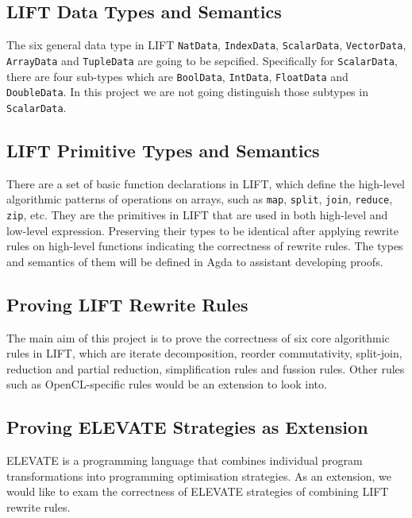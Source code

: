 \documentclass[]{article}
\begin{document}
\subsection{LIFT Data Types and Semantics}
The six general data type in LIFT \texttt{NatData}, \texttt{IndexData}, \texttt{ScalarData}, 
\texttt{VectorData}, \texttt{ArrayData} and \texttt{TupleData} are going to be sepcified. Specifically 
for \texttt{ScalarData}, there are four sub-types which are \texttt{BoolData}, \texttt{IntData}, 
\texttt{FloatData} and \texttt{DoubleData}. In this project we are not going distinguish those subtypes 
in \texttt{ScalarData}.

\subsection{LIFT Primitive Types and Semantics}
There are a set of basic function declarations in LIFT, which define the high-level algorithmic patterns 
of operations on arrays, such as \texttt{map}, \texttt{split}, \texttt{join}, \texttt{reduce}, \texttt{zip}, 
etc. They are the primitives in LIFT that are used in both high-level and low-level expression. Preserving 
their types to be identical after applying rewrite rules on high-level functions indicating the correctness 
of rewrite rules. The types and semantics of them will be defined in Agda to assistant developing proofs.

\subsection{Proving LIFT Rewrite Rules}
The main aim of this project is to prove the correctness of six core algorithmic rules in LIFT, which are 
iterate decomposition, reorder commutativity, split-join, reduction and partial reduction, simplification 
rules and fussion rules. Other rules such as OpenCL-specific rules would be an extension to look into.

\subsection{Proving ELEVATE Strategies as Extension}
ELEVATE is a programming language that combines individual program transformations into programming 
optimisation strategies. As an extension, we would like to exam the correctness of ELEVATE strategies 
of combining LIFT rewrite rules.
\end{document}
